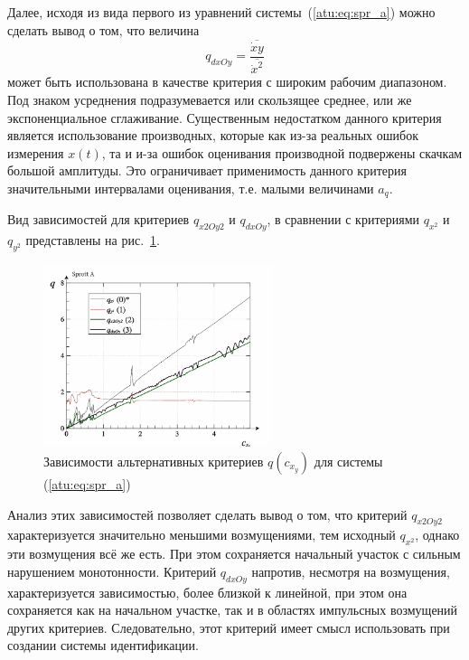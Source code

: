 Далее, исходя из вида первого из уравнений системы~(\ref{atu:eq:spr_a})
можно сделать вывод о том, что величина
%
\begin{equation}
  q_{dxOy} =
  \frac{\overline{\dot{x}y}}{\overline{\dot{x}^2}}
  \label{atu:eq:spr_a_q_dxyOdx2}
\end{equation}
%
может быть использована в качестве критерия с широким рабочим диапазоном.
Под знаком усреднения подразумевается или скользящее среднее,
или же экспоненциальное сглаживание.
Существенным недостатком данного критерия является использование
производных, которые как из-за реальных ошибок измерения $x(t)$,
та и и-за ошибок оценивания производной подвержены
скачкам большой амплитуды. Это ограничивает применимость данного критерия
значительными интервалами оценивания, т.е. малыми величинами $a_q$.

Вид зависимостей для критериев $q_{x2Oy2}$ и $q_{dxOy}$,
в сравнении с критериями $q_{x^2}$ и $q_{y^2}$
представлены на  рис.~\ref{atu:f:spr_a_q_alt}.

\begin{figure}[htb!]
\centerline{
  \includegraphics[width=0.60\textwidth]{p/cha/spr_a/sprott_a_q2-p_c_x_y2.png}
}
\caption{Зависимости альтернативных критериев $q(c_{x_y})$ для системы (\ref{atu:eq:spr_a}) }
\label{atu:f:spr_a_q_alt}
\end{figure}

Анализ этих зависимостей позволяет сделать вывод о том,
что критерий $q_{x2Oy2}$ характеризуется
значительно меньшими возмущениями, тем исходный  $q_{x^2}$,
однако эти возмущения всё же есть. При этом сохраняется
начальный участок с сильным нарушением монотонности.
Критерий $q_{dxOy}$ напротив, несмотря на возмущения,
характеризуется зависимостью, более близкой к линейной,
при этом она сохраняется как на начальном участке,
так и в областях импульсных возмущений других критериев.
Следовательно, этот критерий имеет смысл использовать
при создании системы идентификации.

